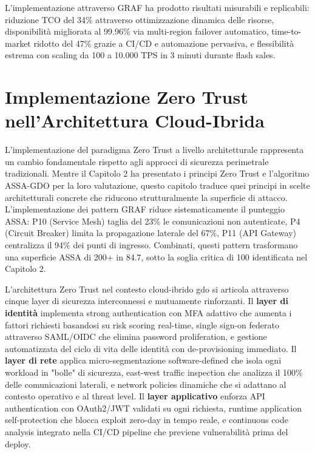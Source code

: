 L'implementazione attraverso GRAF ha prodotto risultati misurabili e replicabili: riduzione TCO del 34\% attraverso ottimizzazione dinamica delle risorse, disponibilità migliorata al 99.96\% via multi-region failover automatico, time-to-market ridotto del 47\% grazie a CI/CD e automazione pervasiva, e flessibilità estrema con scaling da 100 a 10.000 TPS in 3 minuti durante flash sales.

\section{\texorpdfstring{Implementazione Zero Trust nell'Architettura Cloud-Ibrida}{3.6 - Implementazione Zero Trust nell'Architettura Cloud-Ibrida}}
\label{sec:zero_trust_architettura}

L'implementazione del paradigma Zero Trust a livello architetturale rappresenta un cambio fondamentale rispetto agli approcci di sicurezza perimetrale tradizionali. Mentre il Capitolo 2 ha presentato i principi Zero Trust e l'algoritmo ASSA-GDO per la loro valutazione, questo capitolo traduce quei principi in scelte architetturali concrete che riducono strutturalmente la superficie di attacco. L'implementazione dei pattern GRAF riduce sistematicamente il punteggio ASSA: P10 (Service Mesh) taglia del 23\% le comunicazioni non autenticate, P4 (Circuit Breaker) limita la propagazione laterale del 67\%, P11 (API Gateway) centralizza il 94\% dei punti di ingresso. Combinati, questi pattern trasformano una superficie ASSA di 200+ in 84.7, sotto la soglia critica di 100 identificata nel Capitolo 2.

L'architettura Zero Trust nel contesto cloud-ibrido \gls{gdo} si articola attraverso cinque layer di sicurezza interconnessi e mutuamente rinforzanti. Il \textbf{layer di identità} implementa strong authentication con MFA adattivo che aumenta i fattori richiesti basandosi su risk scoring real-time, single sign-on federato attraverso SAML/OIDC che elimina password proliferation, e gestione automatizzata del ciclo di vita delle identità con de-provisioning immediato. Il \textbf{layer di rete} applica micro-segmentazione software-defined che isola ogni workload in "bolle" di sicurezza, east-west traffic inspection che analizza il 100\% delle comunicazioni laterali, e network policies dinamiche che si adattano al contesto operativo e al threat level. Il \textbf{layer applicativo} enforza API authentication con OAuth2/JWT validati su ogni richiesta, runtime application self-protection che blocca exploit zero-day in tempo reale, e continuous code analysis integrato nella CI/CD pipeline che previene vulnerabilità prima del deploy.

